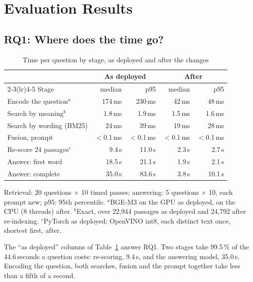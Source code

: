\documentclass[conference]{IEEEtran}
\begin{document}
\section{Evaluation Results}
\label{sec:results}

\subsection{RQ1: Where does the time go?}

\begin{table}[t]
\caption{Time per question by stage, as deployed and after the changes}
\label{tab:stages}
\centering
\footnotesize
\setlength{\tabcolsep}{3.5pt}
\begin{tabular}{@{}lrrrr@{}}
\toprule
 & \multicolumn{2}{c}{As deployed} & \multicolumn{2}{c}{After} \\
\cmidrule(lr){2-3}\cmidrule(lr){4-5}
Stage & median & p95 & median & p95 \\
\midrule
Encode the question$^{a}$        & 174\,ms  & 230\,ms  & 42\,ms   & 48\,ms \\
Search by meaning$^{b}$          & 1.8\,ms  & 1.9\,ms  & 1.5\,ms  & 1.6\,ms \\
Search by wording (BM25)         & 24\,ms   & 39\,ms   & 19\,ms   & 28\,ms \\
Fusion, prompt                   & $<$0.1\,ms & $<$0.1\,ms & $<$0.1\,ms & $<$0.1\,ms \\
Re-score 24 passages$^{c}$       & 9.4\,s   & 11.0\,s  & 2.3\,s   & 2.7\,s \\
Answer: first word               & 18.5\,s  & 21.1\,s  & 1.9\,s   & 2.1\,s \\
Answer: complete                 & 35.0\,s  & 83.6\,s  & 3.8\,s   & 10.1\,s \\
\bottomrule
\end{tabular}

\smallskip
\parbox{\columnwidth}{\scriptsize Retrieval: 20 questions $\times$ 10 timed
passes; answering: 5 questions $\times$ 10, each prompt new; p95: 95th
percentile. $^{a}$BGE-M3 on the GPU as deployed, on the CPU (8 threads)
after. $^{b}$Exact, over 22{,}944 passages as deployed and 24{,}792 after
re-indexing. $^{c}$PyTorch as deployed; OpenVINO int8, each distinct text once,
shortest first, after.}
\end{table}

The ``as deployed'' columns of Table~\ref{tab:stages} answer RQ1. Two stages
take 99.5\,\% of the
44.6\,seconds a question costs: re-scoring, 9.4\,s, and the answering model,
35.0\,s. Encoding the question, both searches, fusion and the prompt together
take less than a fifth of a second.
\end{document}
